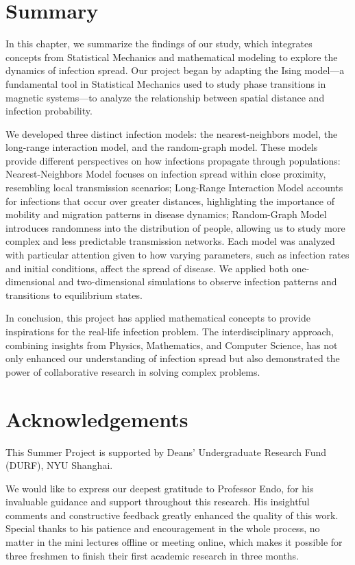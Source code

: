 \documentclass[11pt]{book}
\begin{document}
\chapter{Summary}

In this chapter, we summarize the findings of our study, which integrates concepts from Statistical Mechanics and mathematical modeling to explore the dynamics of infection spread. Our project began by adapting the Ising model—a fundamental tool in Statistical Mechanics used to study phase transitions in magnetic systems—to analyze the relationship between spatial distance and infection probability.

We developed three distinct infection models: the nearest-neighbors model, the long-range interaction model, and the random-graph model. These models provide different perspectives on how infections propagate through populations: Nearest-Neighbors Model focuses on infection spread within close proximity, resembling local transmission scenarios; Long-Range Interaction Model accounts for infections that occur over greater distances, highlighting the importance of mobility and migration patterns in disease dynamics; Random-Graph Model introduces randomness into the distribution of people, allowing us to study more complex and less predictable transmission networks. Each model was analyzed with particular attention given to how varying parameters, such as infection rates and initial conditions, affect the spread of disease. We applied both one-dimensional and two-dimensional simulations to observe infection patterns and transitions to equilibrium states.

In conclusion, this project has applied mathematical concepts to provide inspirations for the real-life infection problem. The interdisciplinary approach, combining insights from Physics, Mathematics, and Computer Science, has not only enhanced our understanding of infection spread but also demonstrated the power of collaborative research in solving complex problems.


\chapter{Acknowledgements}
\noindent

This Summer Project is supported by Deans' Undergraduate Research Fund (DURF), NYU Shanghai.

We would like to express our deepest gratitude to Professor Endo, for his invaluable guidance and support throughout this research. His insightful comments and constructive feedback greatly enhanced the quality of this work. Special thanks to his patience and encouragement in the whole process, no matter in the mini lectures offline or meeting online, which makes it possible for three freshmen to finish their first academic research in three months. 
\end{document}
